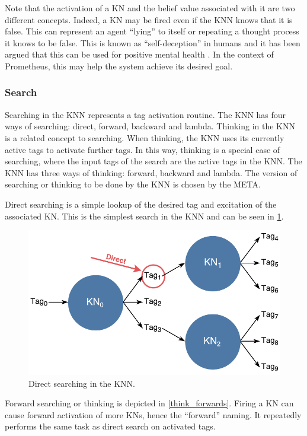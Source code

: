 \documentclass[titlepage,11pt]{article}
\begin{document}
Note that the activation of a KN and the belief value associated with it are two different concepts. Indeed, a KN may be fired even if the KNN knows that it is false. This can represent an agent ``lying'' to itself or repeating a thought process it knows to be false. This is known as ``self-deception'' in humans and it has been argued that this can be used for positive mental health \cite{taylor1989positive}. In the context of Prometheus, this may help the system achieve its desired goal.

\subsubsection{Search}
Searching in the KNN represents a tag activation routine. The KNN has four ways of searching: direct, forward, backward and lambda. Thinking in the KNN is a related concept to searching. When thinking, the KNN uses its currently active tags to activate further tags. In this way, thinking is a special case of searching, where the input tags of the search are the active tags in the KNN. The KNN has three ways of thinking: forward, backward and lambda. The version of searching or thinking to be done by the KNN is chosen by the META. 

Direct searching is a simple lookup of the desired tag and excitation of the associated KN. This is the simplest search in the KNN and can be seen in \cref{fig:direct_search}.

\begin{figure}[!htb]
	\includegraphics[width=\columnwidth]{figures/direct_search.pdf}
	\caption{Direct searching in the KNN.}
	\label{fig:direct_search}
\end{figure}

Forward searching or thinking is depicted in \autoref{think_forwards}. Firing a KN can cause forward activation of more KNs, hence the ``forward'' naming. It repeatedly performs the same task as direct search on activated tags.
\end{document}
